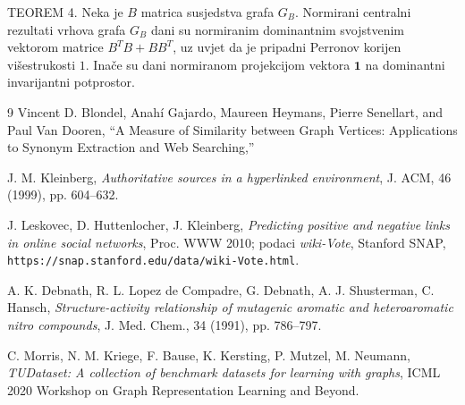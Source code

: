 \documentclass[12pt, letterpaper]{article}
\numberwithin{figure}{section}
\begin{document}
TEOREM 4. Neka je $B$ matrica susjedstva grafa $G_B$. Normirani centralni rezultati
vrhova grafa $G_B$ dani su normiranim dominantnim svojstvenim vektorom
matrice $B^TB+BB^T$, uz uvjet da je pripadni Perronov korijen višestrukosti
$1$. Inače su dani normiranom projekcijom vektora $\mathbf{1}$ na dominantni
invarijantni potprostor.
 \begin{thebibliography}{9}
Vincent D. Blondel, Anah{\'i} Gajardo, Maureen Heymans, Pierre Senellart, and Paul Van Dooren,
``A Measure of Similarity between Graph Vertices: Applications to Synonym Extraction and Web Searching,''
    
J. M. Kleinberg,
\textit{Authoritative sources in a hyperlinked environment},
J. ACM, 46 (1999), pp. 604--632.


J. Leskovec, D. Huttenlocher, J. Kleinberg,
\textit{Predicting positive and negative links in online social networks},
Proc. WWW 2010; podaci \textit{wiki-Vote}, Stanford SNAP, \texttt{https://snap.stanford.edu/data/wiki-Vote.html}.

A. K. Debnath, R. L. Lopez de Compadre, G. Debnath, A. J. Shusterman, C. Hansch,
\textit{Structure-activity relationship of mutagenic aromatic and heteroaromatic nitro compounds},
J. Med. Chem., 34 (1991), pp. 786--797.

C. Morris, N. M. Kriege, F. Bause, K. Kersting, P. Mutzel, M. Neumann,
\textit{TUDataset: A collection of benchmark datasets for learning with graphs},
ICML 2020 Workshop on Graph Representation Learning and Beyond.

\end{thebibliography}
\end{document}
